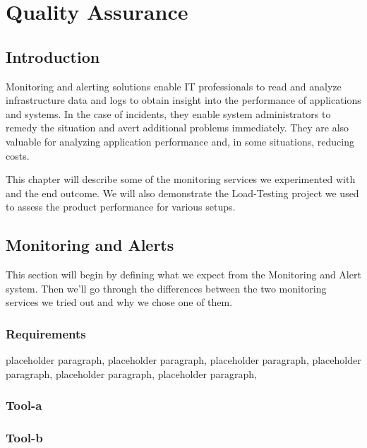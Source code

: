 \chapter{Quality Assurance}

\label{chap_4}


\section*{Introduction}
\qquad Monitoring and alerting solutions enable IT professionals to read and analyze infrastructure data and logs to obtain insight into the performance of applications and systems. In the case of incidents, they enable system administrators to remedy the situation and avert additional problems immediately. They are also valuable for analyzing application performance and, in some situations, reducing costs. 

This chapter will describe some of the monitoring services we experimented with and the end outcome. We will also demonstrate the Load-Testing project we used to assess the product performance for various setups.

\newpage

\section{Monitoring and Alerts}
\qquad This section will begin by defining what we expect from the Monitoring and Alert system. Then we'll go through the differences between the two monitoring services we tried out and why we chose one of them.

\subsection{Requirements}

placeholder paragraph, placeholder paragraph, placeholder paragraph, placeholder paragraph, placeholder paragraph, placeholder paragraph,

\subsection{Tool-a}



\subsection{Tool-b}


